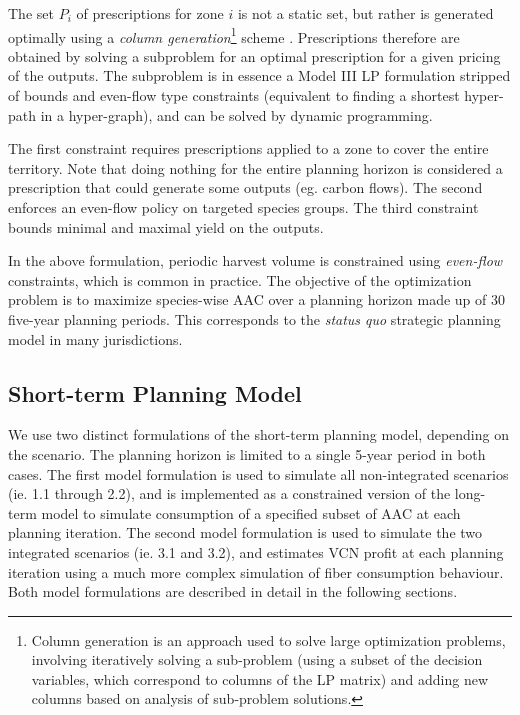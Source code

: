 The set $P_{i}$ of prescriptions for zone $i$ is not a static set, but
rather is generated optimally using a \emph{column
  generation}\footnote{Column generation is an approach used to solve
  large optimization problems, involving iteratively solving a
  sub-problem (using a subset of the decision variables, which
  correspond to columns of the LP matrix) and adding new columns based
  on analysis of sub-problem solutions.} scheme
\citep{desaulniers2005column,dantzig1960decomposition}. Prescriptions
therefore are obtained by solving a subproblem for an optimal
prescription for a given pricing of the outputs. The subproblem is in
essence a Model III LP formulation stripped of bounds and even-flow
type constraints (equivalent to finding a shortest hyper-path in a
hyper-graph), and can be solved by dynamic
programming. %

The first constraint requires prescriptions applied to a zone to cover
the entire territory. Note that doing nothing for the entire planning
horizon is considered a prescription that could generate some outputs
(eg. carbon flows). The second enforces an even-flow policy on targeted species groups. The third
constraint bounds minimal and maximal yield on the outputs.

In the above formulation, periodic harvest volume is constrained using
\emph{even-flow} constraints, which is common in practice. The objective
of the optimization problem is to maximize species-wise AAC over a
planning horizon made up of 30 five-year planning periods. This
corresponds to the \emph{status quo} strategic planning model in many
jurisdictions.


\subsection{Short-term Planning Model}
\label{sec:st-planning-model}

We use two distinct formulations of the short-term planning model,
depending on the scenario. The planning horizon is limited to a single
5-year period in both cases. The first model formulation is used to
simulate all non-integrated scenarios (ie. 1.1 through 2.2), and is
implemented as a constrained version of the long-term model to
simulate consumption of a specified subset of AAC at each planning
iteration. The second model formulation is used to simulate the two
integrated scenarios (ie. 3.1 and 3.2), and estimates VCN profit at
each planning iteration using a much more complex simulation of fiber
consumption behaviour. Both model formulations are described in detail
in the following sections.

